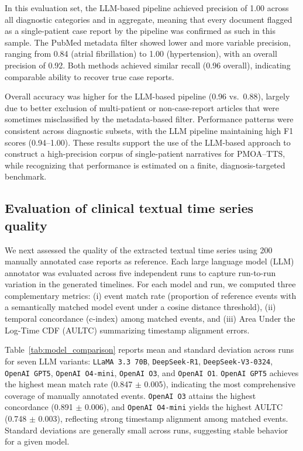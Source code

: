 \documentclass[pdflatex,sn-mathphys-num]{sn-jnl}%
\theoremstyle{thmstyleone}%
\theoremstyle{thmstyletwo}%
\theoremstyle{thmstylethree}%
\begin{document}
In this evaluation set, the LLM-based pipeline achieved precision of 1.00 across all diagnostic categories and in aggregate, meaning that every document flagged as a single-patient case report by the pipeline was confirmed as such in this sample. The PubMed metadata filter showed lower and more variable precision, ranging from 0.84 (atrial fibrillation) to 1.00 (hypertension), with an overall precision of 0.92. Both methods achieved similar recall (0.96 overall), indicating comparable ability to recover true case reports.

Overall accuracy was higher for the LLM-based pipeline (0.96 vs.\ 0.88), largely due to better exclusion of multi-patient or non-case-report articles that were sometimes misclassified by the metadata-based filter. Performance patterns were consistent across diagnostic subsets, with the LLM pipeline maintaining high F1 scores (0.94–1.00). These results support the use of the LLM-based approach to construct a high-precision corpus of single-patient narratives for PMOA--TTS, while recognizing that performance is estimated on a finite, diagnosis-targeted benchmark.

\subsection{Evaluation of clinical textual time series quality}

We next assessed the quality of the extracted textual time series using 200 manually annotated case reports as reference. Each large language model (LLM) annotator was evaluated across five independent runs to capture run-to-run variation in the generated timelines. For each model and run, we computed three complementary metrics: (i) event match rate (proportion of reference events with a semantically matched model event under a cosine distance threshold), (ii) temporal concordance (c-index) among matched events, and (iii) Area Under the Log-Time CDF (AULTC) summarizing timestamp alignment errors.

Table~\ref{tab:model_comparison} reports mean and standard deviation across runs for seven LLM variants: \texttt{LLaMA 3.3 70B}, \texttt{DeepSeek-R1}, \texttt{DeepSeek-V3-0324}, \texttt{OpenAI GPT5}, \texttt{OpenAI O4-mini}, \texttt{OpenAI O3}, and \texttt{OpenAI O1}. \texttt{OpenAI GPT5} achieves the highest mean match rate (0.847 $\pm$ 0.005), indicating the most comprehensive coverage of manually annotated events. \texttt{OpenAI O3} attains the highest concordance (0.891 $\pm$ 0.006), and \texttt{OpenAI O4-mini} yields the highest AULTC (0.748 $\pm$ 0.003), reflecting strong timestamp alignment among matched events. Standard deviations are generally small across runs, suggesting stable behavior for a given model.
\end{document}
